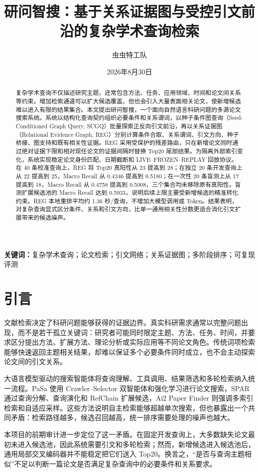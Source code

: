 \documentclass[a4paper,11pt]{ctexart}
\title{研问智搜：基于关系证据图与受控引文前沿的复杂学术查询检索}
\author{虫虫特工队}
\date{2026年8月30日}
\begin{document}
\maketitle

\begin{abstract}
复杂学术查询不仅描述研究主题，还常包含方法、任务、应用领域、时间和论文间关系等约束。增加检索通道可以扩大候选覆盖，但也会引入大量表面相关论文，使新增候选难以进入有限的结果集合。本文提出研问智搜，一个面向自然语言科研问题的多源论文搜索系统。系统以结构化查询契约组织必要条件和关系谓词，以种子条件图查询（Seed-Conditioned Graph Query, SCGQ）批量探索正反向引文前沿，再以关系证据图（Relational Evidence Graph, REG）分别计算条件合取、关系谓词、引文方向、种子桥接、图支持和既有相关性证据。REG 采用受保护的残差路由，只在新增论文同时通过绝对证据下限和相对现任论文的证据间隔时替换 Top20 尾部结果。为隔离外部索引变化，系统实现稳定论文身份匹配、日期截断和 LIVE--FROZEN--REPLAY 回放协议。在 40 条校准查询上，REG 将 Top20 真阳性从 23 提高到 28；在独立 20 条开发查询上从 22 提高到 25，Macro Recall 从 0.4346 提高到 0.5180；在一次性 20 条盲测上从 17 提高到 18，Macro Recall 从 0.4758 提高到 0.5008，三个集合均未移除原有真阳性。盲测扩展候选池的 Macro Recall 达到 0.5933，说明后续上限主要受新增候选的精准转化约束。REG 本地重排平均约 1.36 秒/查询，不增加大模型调用或 Token。结果表明，对复杂查询显式区分条件、关系和引文方向，比单一通用相关性分数更适合消化引文扩展带来的候选噪声。
\end{abstract}

\noindent\textbf{关键词：}复杂学术查询；论文检索；引文网络；关系证据图；多阶段排序；可复现评测

\section{引言}
文献检索决定了科研问题能够获得的证据边界。真实科研需求通常以完整问题出现，而不是若干孤立关键词：研究者可能同时限定主题、方法、任务、时间，并要求区分提出方法、扩展方法、理论分析或实际应用等不同论文角色。传统词项检索能够快速返回主题相关结果，却难以保证多个必要条件同时成立，也不会主动探索论文间的引文关系。

大语言模型驱动的搜索智能体将查询理解、工具调用、结果筛选和多轮检索纳入统一流程。PaSa 使用 Crawler--Selector 双智能体和强化学习进行论文搜索，SPAR 通过查询分解、查询演化和 RefChain 扩展候选，Ai2 Paper Finder 则强调多索引检索和自适应采样。这些方法说明自主检索能够超越单次搜索，但也暴露出一个共同矛盾：检索路径越多，候选召回越高，统一排序需要处理的噪声也越大。

本项目的前期审计进一步定位了这一矛盾。在固定开发查询上，大多数缺失论文最初未进入候选池，因此系统需要引文和多轮检索；然而，新增候选进入候选池后，通用局部交叉编码器并不能稳定把它们送入 Top20。换言之，``是否与查询主题相似''不足以判断一篇论文是否满足复杂查询中的必要条件和关系要求。
\end{document}
